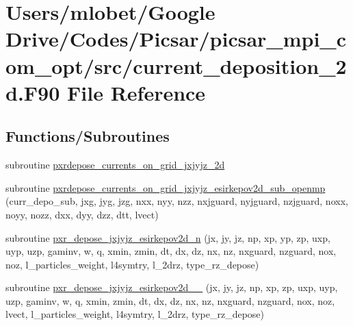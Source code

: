 \hypertarget{current__deposition__2d_8_f90}{}\section{Users/mlobet/\+Google Drive/\+Codes/\+Picsar/picsar\+\_\+mpi\+\_\+com\+\_\+opt/src/current\+\_\+deposition\+\_\+2d.F90 File Reference}
\label{current__deposition__2d_8_f90}
\subsection*{Functions/\+Subroutines}
\begin{DoxyCompactItemize}
\item 
subroutine \hyperlink{current__deposition__2d_8_f90_ad414bf8cb02772ebe516d5520ad22c95}{pxrdepose\+\_\+currents\+\_\+on\+\_\+grid\+\_\+jxjyjz\+\_\+2d}
\item 
subroutine \hyperlink{current__deposition__2d_8_f90_a7384ad64cf4beca09ab1a45d8c323395}{pxrdepose\+\_\+currents\+\_\+on\+\_\+grid\+\_\+jxjyjz\+\_\+esirkepov2d\+\_\+sub\+\_\+openmp} (curr\+\_\+depo\+\_\+sub, jxg, jyg, jzg,                                                       nxx, nyy, nzz, nxjguard, nyjguard, nzjguard, noxx, noyy, nozz, dxx, dyy, dzz, dtt, lvect)
\item 
subroutine \hyperlink{current__deposition__2d_8_f90_a8b3dd693be6a41b342722e15aa4880de}{pxr\+\_\+depose\+\_\+jxjyjz\+\_\+esirkepov2d\+\_\+n} (jx, jy, jz, np, xp, yp, zp, uxp, uyp, uzp, gaminv, w, q, xmin, zmin,                                                                                                                                                                                               dt, dx, dz, nx, nz, nxguard, nzguard,                                                                                                                                                                                               nox, noz, l\+\_\+particles\+\_\+weight, l4symtry, l\+\_\+2drz, type\+\_\+rz\+\_\+depose)
\item 
subroutine \hyperlink{current__deposition__2d_8_f90_afe150c6f9a46d86a94382abd2ad2dee5}{pxr\+\_\+depose\+\_\+jxjyjz\+\_\+esirkepov2d\+\_\+\_} (jx, jy, jz, np, xp, zp, uxp, uyp, uzp, gaminv, w, q, xmin, zmin,                                                                                                                                                                                               dt, dx, dz, nx, nz, nxguard, nzguard,                                                                                                                                                                                               nox, noz, lvect, l\+\_\+particles\+\_\+weight, l4symtry, l\+\_\+2drz, type\+\_\+rz\+\_\+depose)

\end{DoxyCompactItemize}
